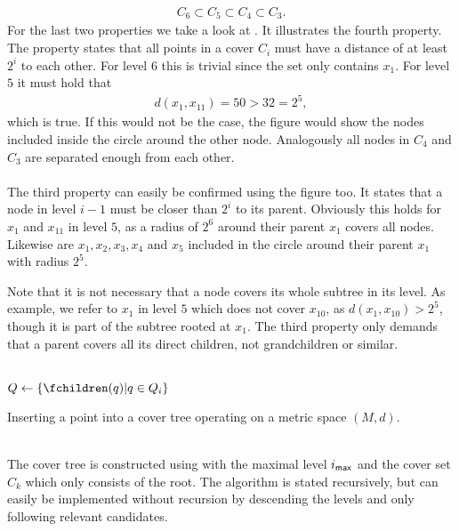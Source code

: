 	\begin{align*}
		C_6 \subset C_5 \subset C_4 \subset C_3.
	\end{align*}
	For the last two properties we take a look at . It illustrates the fourth property.
	The property states that all points in a cover $C_i$ must have a distance of at least $2^i$ to each other.
	For level $6$ this is trivial since the set only contains $x_1$. For level $5$ it must hold that
	\begin{align*}
		d(x_1, x_{11}) = 50 > 32 = 2^5,
	\end{align*}
	which is true. If this would not be the case, the figure would show the nodes included inside the circle
	around the other node. Analogously all nodes in $C_4$ and $C_3$ are separated enough from each other.\\\\
	The third property can easily be confirmed using the figure too. It states that a node in level $i - 1$ must
	be closer than $2^i$ to its parent. Obviously this holds for $x_1$ and $x_{11}$ in level $5$, as a radius
	of $2^6$ around their parent $x_1$ covers all nodes. Likewise are $x_1, x_2, x_3, x_4$ and $x_5$ included
	in the circle around their parent $x_1$ with radius $2^5$.
	
	Note that it is not necessary that a node covers its whole subtree in its level. As example, we refer to $x_1$ in level $5$
	which does not cover $x_{10}$, as $d(x_1, x_{10}) > 2^5$, though it is part of the subtree rooted at $x_1$. The third property only demands
	that a parent covers all its direct children, not grandchildren or similar.\\\\
	\IncMargin{1em}
	\begin{algorithm}
		\BlankLine
		\BlankLine
		$Q \leftarrow \{\fchildren(q) | q \in Q_i\}$\;
		\BlankLine
		\BlankLine
		\caption{Inserting a point into a cover tree operating on a metric space $(M, d)$.}\label{coverTreeInsert}
	\end{algorithm}\DecMargin{1em}\quad\\
	The cover tree is constructed using  with the maximal level $i_{\textsf{max}}$ and the cover
	set $C_k$ which only consists of the root. The algorithm is stated recursively, but can easily be implemented
	without recursion by descending the levels and only following relevant candidates.
	
